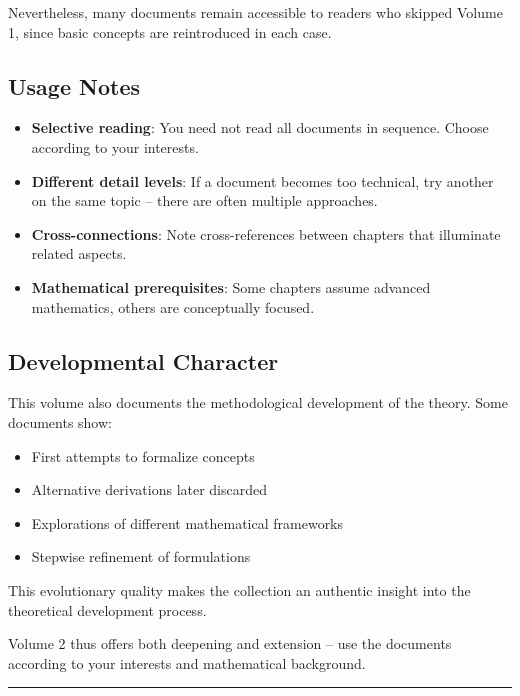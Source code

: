 Nevertheless, many documents remain accessible to readers who skipped Volume 1, since basic concepts are reintroduced in each case.

\subsection*{Usage Notes}

\begin{itemize}
\item \textbf{Selective reading}: You need not read all documents in sequence. Choose according to your interests.

\item \textbf{Different detail levels}: If a document becomes too technical, try another on the same topic -- there are often multiple approaches.

\item \textbf{Cross-connections}: Note cross-references between chapters that illuminate related aspects.

\item \textbf{Mathematical prerequisites}: Some chapters assume advanced mathematics, others are conceptually focused.
\end{itemize}

\subsection*{Developmental Character}

This volume also documents the methodological development of the theory. Some documents show:

\begin{itemize}
\item First attempts to formalize concepts
\item Alternative derivations later discarded
\item Explorations of different mathematical frameworks
\item Stepwise refinement of formulations
\end{itemize}

This evolutionary quality makes the collection an authentic insight into the theoretical development process.

\vspace{1em}
\noindent
Volume 2 thus offers both deepening and extension -- use the documents according to your interests and mathematical background.

\vfill

\begin{center}
\rule{0.5\textwidth}{0.4pt}
\end{center}

